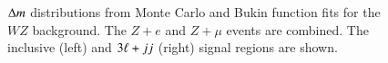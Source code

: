 \begin{figure}[htbp]
    \centering
	\caption{$\Delta m$ distributions from Monte Carlo and Bukin function fits for the $WZ$ background. The $Z+e$ and $Z+\mu$ events are combined. The inclusive (left) and $3\ell+jj$ (right) signal regions are shown.}
	\label{fig:WZ-DiBosonFit}
\end{figure}
 
